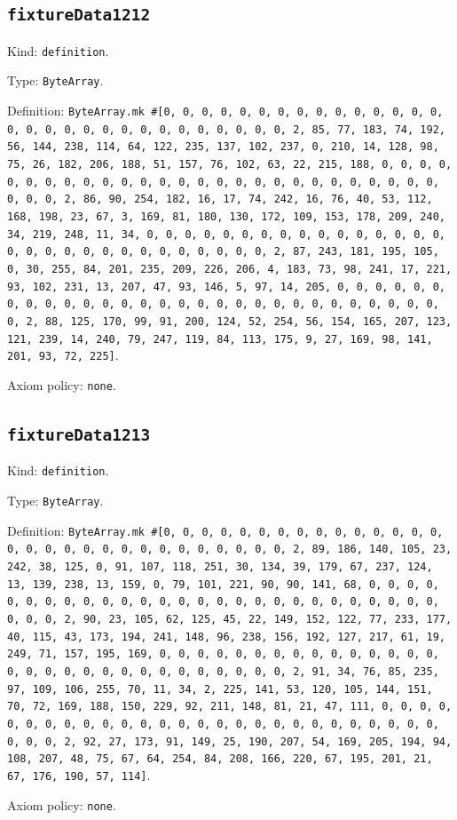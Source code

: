 \documentclass[11pt]{article}
\begin{document}
\subsection*{\texttt{fixtureData1212}}
\noindent Kind: \texttt{definition}.\par
\noindent Type: \texttt{ByteArray}.\par
\noindent Definition: \texttt{ByteArray.mk \#[0, 0, 0, 0, 0, 0, 0, 0, 0, 0, 0, 0, 0, 0, 0, 0, 0, 0, 0, 0, 0, 0, 0, 0, 0, 0, 0, 0, 0, 0, 2, 85, 77, 183, 74, 192, 56, 144, 238, 114, 64, 122, 235, 137, 102, 237, 0, 210, 14, 128, 98, 75, 26, 182, 206, 188, 51, 157, 76, 102, 63, 22, 215, 188, 0, 0, 0, 0, 0, 0, 0, 0, 0, 0, 0, 0, 0, 0, 0, 0, 0, 0, 0, 0, 0, 0, 0, 0, 0, 0, 0, 0, 0, 0, 2, 86, 90, 254, 182, 16, 17, 74, 242, 16, 76, 40, 53, 112, 168, 198, 23, 67, 3, 169, 81, 180, 130, 172, 109, 153, 178, 209, 240, 34, 219, 248, 11, 34, 0, 0, 0, 0, 0, 0, 0, 0, 0, 0, 0, 0, 0, 0, 0, 0, 0, 0, 0, 0, 0, 0, 0, 0, 0, 0, 0, 0, 0, 0, 2, 87, 243, 181, 195, 105, 0, 30, 255, 84, 201, 235, 209, 226, 206, 4, 183, 73, 98, 241, 17, 221, 93, 102, 231, 13, 207, 47, 93, 146, 5, 97, 14, 205, 0, 0, 0, 0, 0, 0, 0, 0, 0, 0, 0, 0, 0, 0, 0, 0, 0, 0, 0, 0, 0, 0, 0, 0, 0, 0, 0, 0, 0, 0, 2, 88, 125, 170, 99, 91, 200, 124, 52, 254, 56, 154, 165, 207, 123, 121, 239, 14, 240, 79, 247, 119, 84, 113, 175, 9, 27, 169, 98, 141, 201, 93, 72, 225]}.\par
\noindent Axiom policy: \texttt{none}.\par
\subsection*{\texttt{fixtureData1213}}
\noindent Kind: \texttt{definition}.\par
\noindent Type: \texttt{ByteArray}.\par
\noindent Definition: \texttt{ByteArray.mk \#[0, 0, 0, 0, 0, 0, 0, 0, 0, 0, 0, 0, 0, 0, 0, 0, 0, 0, 0, 0, 0, 0, 0, 0, 0, 0, 0, 0, 0, 0, 2, 89, 186, 140, 105, 23, 242, 38, 125, 0, 91, 107, 118, 251, 30, 134, 39, 179, 67, 237, 124, 13, 139, 238, 13, 159, 0, 79, 101, 221, 90, 90, 141, 68, 0, 0, 0, 0, 0, 0, 0, 0, 0, 0, 0, 0, 0, 0, 0, 0, 0, 0, 0, 0, 0, 0, 0, 0, 0, 0, 0, 0, 0, 0, 2, 90, 23, 105, 62, 125, 45, 22, 149, 152, 122, 77, 233, 177, 40, 115, 43, 173, 194, 241, 148, 96, 238, 156, 192, 127, 217, 61, 19, 249, 71, 157, 195, 169, 0, 0, 0, 0, 0, 0, 0, 0, 0, 0, 0, 0, 0, 0, 0, 0, 0, 0, 0, 0, 0, 0, 0, 0, 0, 0, 0, 0, 0, 0, 2, 91, 34, 76, 85, 235, 97, 109, 106, 255, 70, 11, 34, 2, 225, 141, 53, 120, 105, 144, 151, 70, 72, 169, 188, 150, 229, 92, 211, 148, 81, 21, 47, 111, 0, 0, 0, 0, 0, 0, 0, 0, 0, 0, 0, 0, 0, 0, 0, 0, 0, 0, 0, 0, 0, 0, 0, 0, 0, 0, 0, 0, 0, 0, 2, 92, 27, 173, 91, 149, 25, 190, 207, 54, 169, 205, 194, 94, 108, 207, 48, 75, 67, 64, 254, 84, 208, 166, 220, 67, 195, 201, 21, 67, 176, 190, 57, 114]}.\par
\noindent Axiom policy: \texttt{none}.\par
\end{document}
